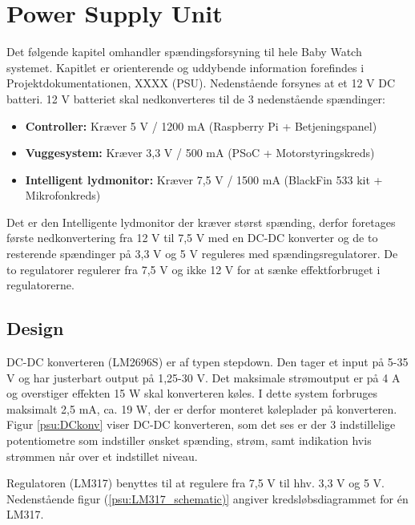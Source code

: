\chapter{Power Supply Unit}

Det følgende kapitel omhandler spændingsforsyning til hele Baby Watch systemet. Kapitlet er orienterende og uddybende information forefindes i Projektdokumentationen, XXXX (PSU). Nedenstående forsynes at et 12 V DC batteri. 12 V batteriet skal nedkonverteres til de 3 nedenstående spændinger: 
\begin{itemize}
\item \textbf{Controller:} Kræver 5 V / 1200 mA (Raspberry Pi + Betjeningspanel)

\item \textbf{Vuggesystem:} Kræver 3,3 V / 500 mA (PSoC + Motorstyringskreds)

\item \textbf{Intelligent lydmonitor:} Kræver 7,5 V / 1500 mA (BlackFin 533 kit + Mikrofonkreds)
\end{itemize}

Det er den Intelligente lydmonitor der kræver størst spænding, derfor foretages første nedkonvertering fra 12 V til 7,5 V med en DC-DC konverter og de to resterende spændinger på 3,3 V og 5 V reguleres med spændingsregulatorer. De to regulatorer regulerer fra 7,5 V og ikke 12 V for at sænke effektforbruget i regulatorerne. 

\section{Design}

DC-DC konverteren (LM2696S) er af typen stepdown. Den tager et input på 5-35 V og har justerbart output på 1,25-30 V. Det maksimale strømoutput er på 4 A og overstiger effekten 15 W skal konverteren køles. I dette system forbruges maksimalt 2,5 mA, ca. 19 W, der er derfor monteret køleplader på konverteren. Figur \ref{psu:DCkonv} viser DC-DC konverteren, som det ses er der 3 indstillelige potentiometre som indstiller ønsket spænding, strøm, samt indikation hvis strømmen når over et indstillet niveau.  


\newpage

Regulatoren (LM317) benyttes til at regulere fra 7,5 V til hhv. 3,3 V og 5 V. Nedenstående figur (\ref{psu:LM317_schematic)} angiver kredsløbsdiagrammet for én LM317.

